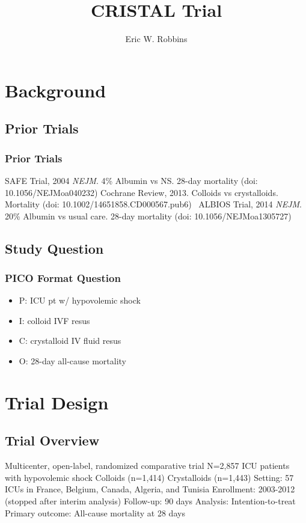 \documentclass{beamer}
\title{CRISTAL Trial}
\author{Eric W. Robbins}
\date{}
\begin{document}
	\begin{frame}
		\maketitle
	\end{frame}
	\begin{frame}
		\tableofcontents
	\end{frame}
\section{Background}
\subsection{Prior Trials}
	\begin{frame}
		\frametitle{Prior Trials}
		SAFE Trial, 2004 \emph{NEJM}. 4\% Albumin vs NS. 28-day mortality (doi: 10.1056/NEJMoa040232)
		Cochrane Review, 2013. Colloids vs crystalloids. Mortality (doi: 10.1002/14651858.CD000567.pub6)
		\
		ALBIOS Trial, 2014 \emph{NEJM}. 20\% Albumin vs usual care. 28-day mortality (doi: 10.1056/NEJMoa1305727)
	\end{frame}
\subsection{Study Question}
\begin{frame}
		\frametitle{PICO Format Question}
			\begin{itemize}
				\item P: ICU pt w/ hypovolemic shock
				\item I: colloid IVF resus
				\item C: crystalloid IV fluid resus 
				\item O: 28-day all-cause mortality
			\end{itemize}
	\end{frame}
\section{Trial Design}
\subsection{Trial Overview}
Multicenter, open-label, randomized comparative trial
N=2,857 ICU patients with hypovolemic shock
Colloids (n=1,414)
Crystalloids (n=1,443)
Setting: 57 ICUs in France, Belgium, Canada, Algeria, and Tunisia
Enrollment: 2003-2012 (stopped after interim analysis)
Follow-up: 90 days
Analysis: Intention-to-treat
Primary outcome: All-cause mortality at 28 days
\end{document}
